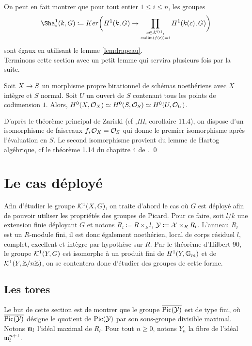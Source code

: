 \documentclass[11pt]{article}
\begin{document}
\rmke On peut en fait montrer que pour tout entier $1 \leq i \leq n$, les groupes
$$
\Sha^1_i(k,G) \coloneqq Ker\bigg(H^1(k,G) \ra \prod_{\underset{\text{codim}(f(c)) = i}{c \in \CX^{(i)},}}H^1(k(c),G) \bigg)
$$
sont égaux en utilisant le lemme \ref{lemdrapeau}.\\

Terminons cette section avec un petit lemme qui servira plusieurs fois par la suite.

\begin{lemme}\label{lemzariski}
    Soit $X \rightarrow S$ un morphisme propre birationnel de schémas noethériens avec $X$ intègre et $S$ normal. Soit $U$ un ouvert de $S$ contenant tous les points de codimension $1$. Alors, $H^0(X,\mathcal{O}_X) \simeq H^0(S,\mathcal{O}_S) \simeq H^0(U,\mathcal{O}_U)$.
\end{lemme}

\proof 
D'après le théorème principal de Zariski (cf \cite{Hartshorne},\textit{III}, corollaire 11.4), on dispose d'un isomorphisme de faisceaux $f_*\mathcal{O}_X = \mathcal{O}_S$ qui donne le premier isomorphisme après l'évaluation en $S$.
Le second isomorphisme provient du lemme de Hartog algébrique, cf le théorème 1.14 du chapitre $4$ de \cite{Liu}. \qed

\section{Le cas déployé}\label{secdéployé}
Afin d'étudier le groupe $\mathcal{K}^1(X,G)$, on traite d'abord le cas où $G$ est déployé afin de pouvoir utiliser les propriétés des groupes de Picard. Pour ce faire, soit $l/ k$ une extension finie déployant $G$ et notons $R_l \coloneqq R \times_k l$, $\CY \coloneqq \CX \times_R R_l$. L'anneau $R_l$ est un $R$-module fini, il est donc également noethérien, local de corps résiduel $l$, complet, excellent et intègre par hypothèse sur $R$.  Par le théorème d'Hilbert 90, le groupe $\mathcal{K}^1(Y,G)$ est isomorphe à un produit fini de $H^1(Y, \mathbb{G}_m)$ et de $\mathcal{K}^1(Y, \mathbb{Z} / n\mathbb{Z})$, on se contentera donc d'étudier des groupes de cette forme.

\subsection{Les tores}\label{sectiontores}
Le but de cette section est de montrer que le groupe $\overline{\operatorname{Pic}(\mathcal{Y})}$  est de type fini, où $\overline{\operatorname{Pic}(\mathcal{Y})}$ désigne le quotient de $\operatorname{Pic}(\mathcal{Y})$ par son sous-groupe divisible maximal.
Notons $\mathfrak{m}_l$ l'idéal maximal de $R_l$. Pour tout $n \geq 0$, notons $Y_n$ la fibre de l'idéal $\mathfrak{m}_l^{n+1}$.
\end{document}
